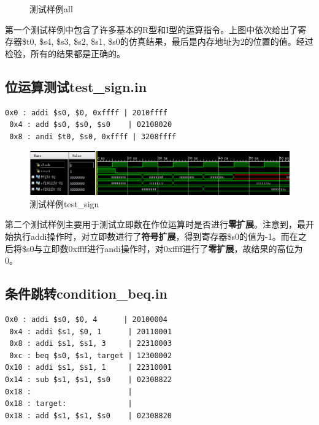 \documentclass[twocolumn]{article} %
\begin{document}
\begin{sloppypar}
\begin{figure}[htbp]
\caption{测试样例all}
\end{figure}

第一个测试样例中包含了许多基本的R型和I型的运算指令。上图中依次给出了寄存器\$t0, \$s4, \$s3, \$s2, \$s1, \$s0的仿真结果，最后是内存地址为2的位置的值。经过检验，所有的结果都是正确的。

\subsection{位运算测试test\_sign.in}

\begin{lstlisting}[]  
 0x0 : addi $s0, $0, 0xffff | 2010ffff
 0x4 : add $s0, $s0, $s0    | 02108020
 0x8 : andi $t0, $s0, 0xffff | 3208ffff
\end{lstlisting}  

\begin{figure}[htbp]
\centering
\includegraphics[width =0.9 \linewidth]{figure/testsign.png}
\caption{测试样例test\_sign}
\end{figure}

第二个测试样例主要用于测试立即数在作位运算时是否进行{\bf 零扩展}。注意到，最开始执行addi操作时，对立即数进行了{\bf 符号扩展}，得到寄存器\$s0的值为-1。而在之后将\$s0与立即数0xffff进行andi操作时，对0xffff进行了{\bf 零扩展}，故结果的高位为0。

\subsection{条件跳转condition\_beq.in}

\begin{lstlisting}[]  
 0x0 : addi $s0, $0, 4      | 20100004
 0x4 : addi $s1, $0, 1      | 20110001
 0x8 : addi $s1, $s1, 3     | 22310003
 0xc : beq $s0, $s1, target | 12300002
0x10 : addi $s1, $s1, 1     | 22310001
0x14 : sub $s1, $s1, $s0    | 02308822
0x18 :                      | 
0x18 : target:              | 
0x18 : add $s1, $s1, $s0    | 02308820
\end{lstlisting}  


\end{sloppypar}
\end{document}
